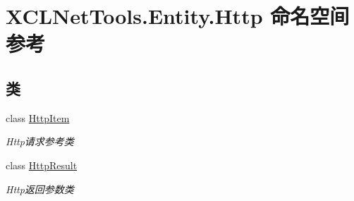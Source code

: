 \hypertarget{namespace_x_c_l_net_tools_1_1_entity_1_1_http}{}\section{X\+C\+L\+Net\+Tools.\+Entity.\+Http 命名空间参考}
\label{namespace_x_c_l_net_tools_1_1_entity_1_1_http}
\subsection*{类}
\begin{DoxyCompactItemize}
\item 
class \hyperlink{class_x_c_l_net_tools_1_1_entity_1_1_http_1_1_http_item}{Http\+Item}
\begin{DoxyCompactList}\small\item\em Http请求参考类 \end{DoxyCompactList}\item 
class \hyperlink{class_x_c_l_net_tools_1_1_entity_1_1_http_1_1_http_result}{Http\+Result}
\begin{DoxyCompactList}\small\item\em Http返回参数类 \end{DoxyCompactList}\end{DoxyCompactItemize}
